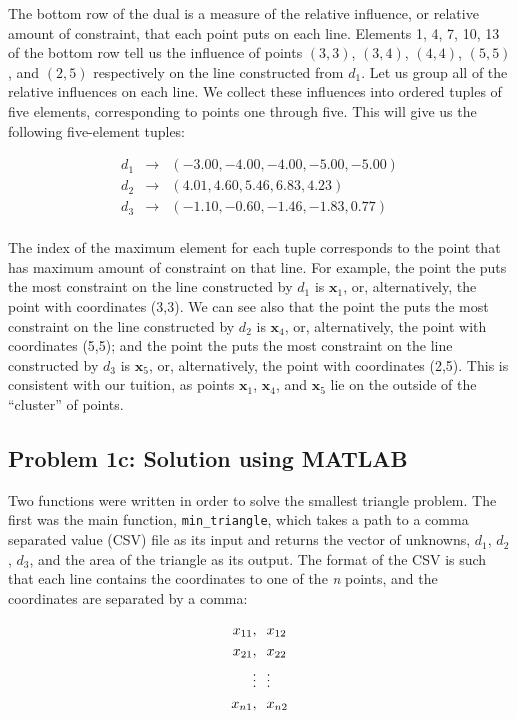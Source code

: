 \documentclass{article}
\begin{document}
The bottom row of the dual is a measure of the relative influence, or relative amount of constraint, that each point puts on each line.
Elements 1, 4, 7, 10, 13 of the bottom row tell us the influence of points $(3,3)$, $(3,4)$, $(4,4)$, $(5,5)$, and $(2,5)$ respectively on the line constructed from $d_1$.
Let us group all of the relative influences on each line. We collect these influences into ordered tuples of five elements, corresponding to points one through five.
This will give us the following five-element tuples:

\begin{eqnarray*}
d_1 & \rightarrow & (-3.00, -4.00, -4.00, -5.00, -5.00)\\
d_2 & \rightarrow & (4.01, 4.60, 5.46, 6.83, 4.23)\\
d_3 & \rightarrow & (-1.10, -0.60, -1.46, -1.83, 0.77)\\
\end{eqnarray*}

The index of the maximum element for each tuple corresponds to the point that has maximum amount of constraint on that line.
For example, the point the puts the most constraint on the line constructed by $d_1$ is $\mathbf{x}_1$, or, alternatively, the point with coordinates (3,3).
We can see also that the point the puts the most constraint on the line constructed by $d_2$ is $\mathbf{x}_4$, or, alternatively, the point with coordinates (5,5); and the point the puts the most constraint on the line constructed by $d_3$ is $\mathbf{x}_5$, or, alternatively, the point with coordinates (2,5).
This is consistent with our tuition, as points $\mathbf{x}_1$, $\mathbf{x}_4$, and $\mathbf{x}_5$ lie on the outside of the ``cluster'' of points.

\subsection{Problem 1c: Solution using MATLAB}

Two functions were written in order to solve the smallest triangle problem.
The first was the main function, \texttt{min\_triangle}, which takes a path to a comma separated value (CSV) file as its input and returns the vector of unknowns, $d_1$, $d_2$, $d_3$, and the area of the triangle as its output.
The format of the CSV is such that each line contains the coordinates to one of the \textit{n} points, and the coordinates are separated by a comma:

\begin{align*}
x_{11}, & \hspace{0.1in} x_{12}\\
x_{21}, & \hspace{0.1in} x_{22}\\
\vdots & \hspace{0.1in} \vdots\\
x_{n1}, & \hspace{0.1in} x_{n2}
\end{align*}
\end{document}
